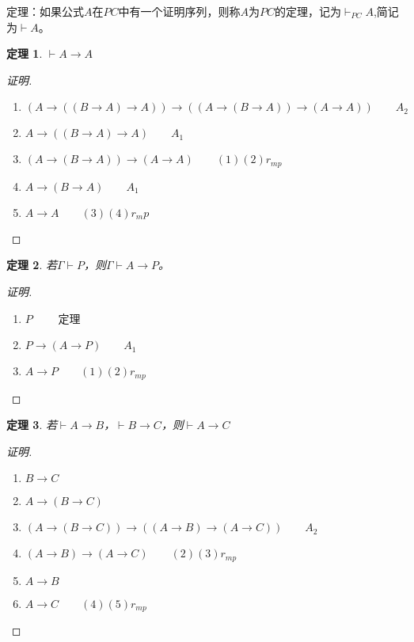 \documentclass{article}
\newtheorem{Thm}{定理}
\begin{document}
\begin{CJK*}{UTF8}{gbsn}
\begin{enumerate}
    定理：如果公式$A$在$PC$中有一个证明序列，则称$A$为$PC$的定理，记为$\vdash_{PC}A$,简记为$\vdash A$。

  \end{enumerate}

  
  \begin{Thm}$\vdash A\to A$\end{Thm}
  \begin{proof}[证明]$\quad$

    \begin{enumerate}
      \item $(A\to ((B\to A) \to A))\to ((A\to (B\to A)) \to (A\to A)) \quad\quad A_2$
      \item $A\to ((B\to A) \to A) \quad\quad A_1$
      \item $(A\to (B\to A)) \to (A\to A) \quad\quad (1)(2)r_{mp}$
      \item $A\to (B\to A) \quad\quad A_1$
      \item $A\to A \quad\quad (3)(4)r_mp$  
    \end{enumerate}
  \end{proof}

  \begin{Thm}若$\Gamma\vdash P$，则$\Gamma\vdash A\to P$。\end{Thm}
  \begin{proof}[证明]$\quad$
    \begin{enumerate}
      \item $P \quad\quad$ 定理
      \item $P\to (A\to P) \quad\quad A_1$
      \item $A\to P \quad\quad (1)(2)r_{mp}$
    \end{enumerate}
  \end{proof}

  \begin{Thm}若$\vdash A\to B$，$\vdash B\to C$，则$\vdash A\to C$\end{Thm}
  \begin{proof}[证明]$\quad$
    \begin{enumerate}
      \item $B \to C$
      \item $A\to (B\to C)$
      \item $(A\to (B\to C)) \to ((A\to B)\to (A\to C))\quad \quad A_2$
      \item $(A\to B)\to (A\to C) \quad\quad(2)(3)r_{mp}$
      \item $A\to B$
      \item $A\to C \quad\quad(4)(5)r_{mp}$
    \end{enumerate}
  \end{proof}


\end{CJK*}
\end{document}
